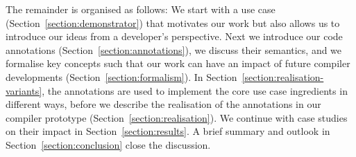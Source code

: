 The remainder is organised as follows:
We start with a use case (Section~\ref{section:demonstrator}) that motivates our work but also allows us to introduce our ideas from a developer's perspective. 
Next we introduce our code annotations (Section~\ref{section:annotations}), we discuss their semantics, and we formalise key concepts such that our work can have an impact of future compiler developments (Section~\ref{section:formalism}). 
In Section~\ref{section:realisation-variants}, the annotations are used to implement the core use case ingredients in different ways, 
before we describe the realisation of the annotations in our compiler prototype (Section~\ref{section:realisation}).
We continue with case studies on their impact in Section~\ref{section:results}.
A brief summary and outlook in Section~\ref{section:conclusion} close the discussion.
